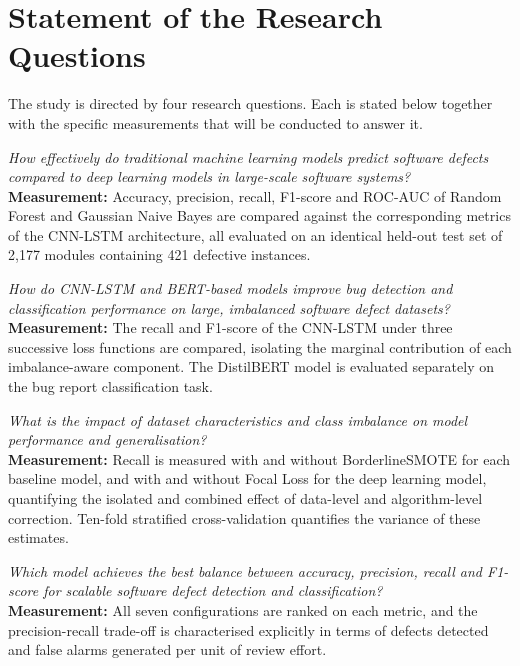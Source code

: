 \documentclass[12pt,a4paper,oneside]{report}
\begin{document}
\section{Statement of the Research Questions}

The study is directed by four research questions. Each is stated below together with the specific measurements that will be conducted to answer it.

\begin{description}[leftmargin=3em,style=nextline,itemsep=6pt]
  \item[RQ1:] \textit{How effectively do traditional machine learning models predict software defects compared to deep learning models in large-scale software systems?}\\
  \textbf{Measurement:} Accuracy, precision, recall, F1-score and ROC-AUC of Random Forest and Gaussian Naive Bayes are compared against the corresponding metrics of the CNN-LSTM architecture, all evaluated on an identical held-out test set of 2,177 modules containing 421 defective instances.

  \item[RQ2:] \textit{How do CNN-LSTM and BERT-based models improve bug detection and classification performance on large, imbalanced software defect datasets?}\\
  \textbf{Measurement:} The recall and F1-score of the CNN-LSTM under three successive loss functions are compared, isolating the marginal contribution of each imbalance-aware component. The DistilBERT model is evaluated separately on the bug report classification task.

  \item[RQ3:] \textit{What is the impact of dataset characteristics and class imbalance on model performance and generalisation?}\\
  \textbf{Measurement:} Recall is measured with and without BorderlineSMOTE for each baseline model, and with and without Focal Loss for the deep learning model, quantifying the isolated and combined effect of data-level and algorithm-level correction. Ten-fold stratified cross-validation quantifies the variance of these estimates.

  \item[RQ4:] \textit{Which model achieves the best balance between accuracy, precision, recall and F1-score for scalable software defect detection and classification?}\\
  \textbf{Measurement:} All seven configurations are ranked on each metric, and the precision-recall trade-off is characterised explicitly in terms of defects detected and false alarms generated per unit of review effort.
\end{description}
\end{document}
